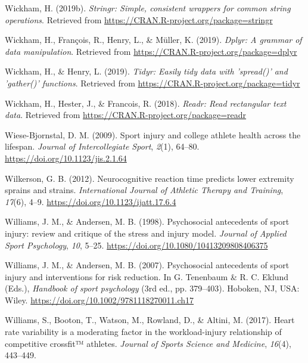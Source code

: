 \documentclass[
  english,
  man,floatsintext]{apa6}
\begin{document}
\leavevmode\hypertarget{ref-R-stringr}{}%
Wickham, H. (2019b). \emph{Stringr: Simple, consistent wrappers for common string operations}. Retrieved from \url{https://CRAN.R-project.org/package=stringr}

\leavevmode\hypertarget{ref-R-dplyr}{}%
Wickham, H., François, R., Henry, L., \& Müller, K. (2019). \emph{Dplyr: A grammar of data manipulation}. Retrieved from \url{https://CRAN.R-project.org/package=dplyr}

\leavevmode\hypertarget{ref-R-tidyr}{}%
Wickham, H., \& Henry, L. (2019). \emph{Tidyr: Easily tidy data with 'spread()' and 'gather()' functions}. Retrieved from \url{https://CRAN.R-project.org/package=tidyr}

\leavevmode\hypertarget{ref-R-readr}{}%
Wickham, H., Hester, J., \& Francois, R. (2018). \emph{Readr: Read rectangular text data}. Retrieved from \url{https://CRAN.R-project.org/package=readr}

\leavevmode\hypertarget{ref-Wiese-Bjornstal2009}{}%
Wiese-Bjornstal, D. M. (2009). Sport injury and college athlete health across the lifespan. \emph{Journal of Intercollegiate Sport}, \emph{2}(1), 64--80. \url{https://doi.org/10.1123/jis.2.1.64}

\leavevmode\hypertarget{ref-Wilkerson2012a}{}%
Wilkerson, G. B. (2012). Neurocognitive reaction time predicts lower extremity sprains and strains. \emph{International Journal of Athletic Therapy and Training}, \emph{17}(6), 4--9. \url{https://doi.org/10.1123/ijatt.17.6.4}

\leavevmode\hypertarget{ref-Williams1998}{}%
Williams, J. M., \& Andersen, M. B. (1998). Psychosocial antecedents of sport injury: review and critique of the stress and injury model. \emph{Journal of Applied Sport Psychology}, \emph{10}, 5--25. \url{https://doi.org/10.1080/10413209808406375}

\leavevmode\hypertarget{ref-Williams2007}{}%
Williams, J. M., \& Andersen, M. B. (2007). Psychosocial antecedents of sport injury and interventions for risk reduction. In G. Tenenbaum \& R. C. Eklund (Eds.), \emph{Handbook of sport psychology} (3rd ed., pp. 379--403). Hoboken, NJ, USA: Wiley. \url{https://doi.org/10.1002/9781118270011.ch17}

\leavevmode\hypertarget{ref-Williams2017}{}%
Williams, S., Booton, T., Watson, M., Rowland, D., \& Altini, M. (2017). Heart rate variability is a moderating factor in the workload-injury relationship of competitive crossfit™ athletes. \emph{Journal of Sports Science and Medicine}, \emph{16}(4), 443--449.
\end{document}
